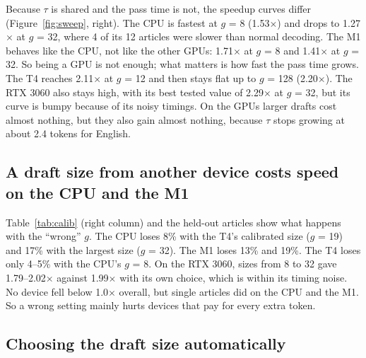 \documentclass{article}
\newcommand{\tms}{\ensuremath{\times}}
\begin{document}
Because $\tau$ is shared and the pass time is not, the speedup curves differ (Figure~\ref{fig:sweep}, right).
The CPU is fastest at $g$ = 8 (1.53\tms) and drops to 1.27\tms{} at $g$ = 32, where 4 of its 12 articles were slower than normal decoding.
The M1 behaves like the CPU, not like the other GPUs: 1.71\tms{} at $g$ = 8 and 1.41\tms{} at $g$ = 32.
So being a GPU is not enough; what matters is how fast the pass time grows.
The T4 reaches 2.11\tms{} at $g$ = 12 and then stays flat up to $g$ = 128 (2.20\tms).
The RTX 3060 also stays high, with its best tested value of 2.29\tms{} at $g$ = 32, but its curve is bumpy because of its noisy timings.
On the GPUs larger drafts cost almost nothing, but they also gain almost nothing, because $\tau$ stops growing at about 2.4 tokens for English.

\subsection{A draft size from another device costs speed on the CPU and the M1}

Table~\ref{tab:calib} (right column) and the held-out articles show what happens with the ``wrong'' $g$.
The CPU loses 8\% with the T4's calibrated size ($g$ = 19) and 17\% with the largest size ($g$ = 32).
The M1 loses 13\% and 19\%.
The T4 loses only 4--5\% with the CPU's $g$ = 8.
On the RTX 3060, sizes from 8 to 32 gave 1.79--2.02\tms{} against 1.99\tms{} with its own choice, which is within its timing noise.
No device fell below 1.0\tms{} overall, but single articles did on the CPU and the M1.
So a wrong setting mainly hurts devices that pay for every extra token.

\subsection{Choosing the draft size automatically}
\end{document}
